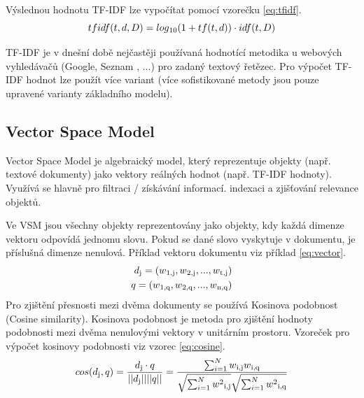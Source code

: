\documentclass[12pt, a4paper]{article}
\begin{document}
Výslednou hodnotu TF-IDF lze vypočítat pomocí vzorečku \ref{eq:tfidf}.
\begin{equation}
tfidf(t,d,D) = log\textsubscript{10}(1 + tf(t,d)) \cdot idf(t,D)
\label{eq:tfidf} 
\end{equation}

TF-IDF je v dnešní době nejčastěji používaná hodnotící metodika u webových vyhledávačů (Google, Seznam , ...) pro zadaný textový řetězec. Pro výpočet TF-IDF hodnot lze použít více variant (více sofistikované metody jsou pouze upravené varianty základního modelu).


\subsection{Vector Space Model}
Vector Space Model je algebraický model, který reprezentuje objekty (např. textové dokumenty) jako vektory reálných hodnot (např. TF-IDF hodnoty). Využívá se hlavně pro filtraci / získávání informací. indexaci a zjišťování relevance objektů.

Ve VSM jsou všechny objekty reprezentovány jako objekty, kdy každá dimenze vektoru odpovídá jednomu slovu. Pokud se dané slovo vyskytuje v dokumentu, je příslušná dimenze nenulová. Příklad vektoru dokumentu viz příklad \ref{eq:vector}.
\begin{equation}
\begin{aligned}
d\textsubscript{j} = (w\textsubscript{1,j}, w\textsubscript{2,j}, ..., w\textsubscript{t,j}) \\
q = (w\textsubscript{1,q}, w\textsubscript{2,q}, ..., w\textsubscript{n,q})
\end{aligned}
\label{eq:vector} 
\end{equation}
Pro zjištění přesnosti mezi dvěma dokumenty se používá Kosinova podobnost (Cosine similarity). Kosinova podobnost je metoda pro zjištění hodnoty podobnosti mezi dvěma nenulovými vektory v unitárním prostoru. Vzoreček pro výpočet kosinovy podobnosti viz vzorec \ref{eq:cosine}.
\begin{equation}
\begin{aligned}
cos(d\textsubscript{j}, q) = \frac{d\textsubscript{j} \cdot q}{|| d\textsubscript{j} ||  || q ||} = \frac{\sum_{i=1}^N w\textsubscript{i,j}w\textsubscript{i,q}}{\sqrt{\sum_{i=1}^N w^2\textsubscript{i,j}} \sqrt{\sum_{i=1}^N w^2\textsubscript{i,q}}}
\end{aligned}
\label{eq:cosine} 
\end{equation}

\newpage
\end{document}
